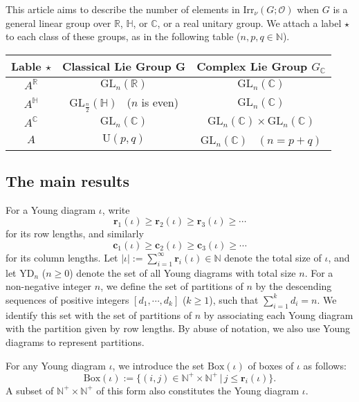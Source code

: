 \documentclass[12pt, a4paper]{amsart}
\numberwithin{equation}{section}
\newcommand{\br}{{\mathbf{r}}}
\newcommand{\bc}{{\mathbf{c}}}
\newcommand{\BC}{{\mathbb {C}}}
\newcommand{\BH}{{\mathbb {H}}}
\newcommand{\BN}{{\mathbb {N}}}
\newcommand{\BR}{{\mathbb {R}}}
\newcommand{\CO}{{\mathcal {O}}}
\newcommand{\GL}{{\mathrm{GL}}}
\newcommand{\U}{{\mathrm{U}}}
\newcommand{\Irr}{{\mathrm{Irr}}}
\newcommand{\set}[2]{\{#1\,|\,#2\}}
\begin{document}
This article aims to describe the number of elements in $\Irr_{\nu}(G;\CO)$ when $G$ is a general linear group over $\BR$, $\BH$, or $\BC$, or a real unitary group. We attach a label $\star$ to each class of these groups, as in the following table ($n,p,q \in \BN $).

\begin{center}
   \begin{tabular}{ccc}
      \toprule
      Lable $\star $ & Classical Lie Group G & Complex Lie Group $G_{\BC}$    \\
      \midrule
      $A^{\BR}$      & $\GL_n(\BR)$          & $\GL_n(\BC)$                   \\
      $A^{\BH}$      & $\GL_{\frac{n}{2}}(\BH)$ \  ($n$ is even)      & $\GL_n(\BC)$                   \\
      $A^{\BC}$      & $\GL_n(\BC)$          & $\GL_n(\BC) \times \GL_n(\BC)$ \\
      $A$            & $\U(p,q)$              & $\GL_n(\BC)$ \ $(n = p + q)$                   \\
      \bottomrule
   \end{tabular}
\end{center}



\subsection{The main results}
For a Young diagram $\iota$, write
$$\br_1(\iota) \geq \br_2(\iota) \geq \br_3(\iota) \geq \cdots$$
for its row lengths, and similarly
$$\bc_1(\iota) \geq \bc_2(\iota) \geq \bc_3(\iota) \geq \cdots$$
for its column lengths. Let $|\iota|:= \sum_{i=1}^{\infty}\br_i(\iota) \in \BN$ denote the total size of $\iota$, and let $\mathrm{YD}_{n}$ ($n \geq 0$) denote the set of all Young diagrams with total size $n$. For a non-negative integer $n$, we define the set of partitions of $n$ by the descending sequences of positive integers $[d_1,\cdots,d_k]$ ($k \geq 1$), such that $\sum_{i=1}^{k}d_i = n$.  We identify this set with the set of partitions of $n$ by associating each Young diagram with the partition given by row lengths. By abuse of notation, we also use Young diagrams to represent partitions.

For any Young diagram $\iota$, we introduce the set $\mathrm{Box}(\iota)$ of boxes of $\iota$ as follows:
\begin{equation}
   \mathrm{Box}(\iota) := \set{(i,j) \in \BN^{+} \times \BN^{+}}{j \leq \br_i(\iota)}.
\end{equation}
A subset of $\BN^{+} \times \BN^{+}$ of this form also constitutes the Young diagram $\iota$.
\end{document}
